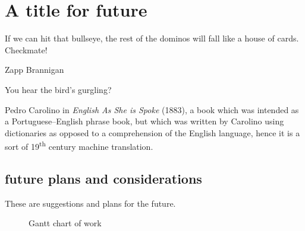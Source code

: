 \chapter{A title for future}
\label{chapter:future}

\epigraph{If we can hit that bullseye, the rest of the dominos will fall like a house of cards. Checkmate!}{Zapp Brannigan}

\epigraph{You hear the bird's gurgling?}{Pedro Carolino in \emph{English As She is Spoke} (1883), a book which was intended as a Portuguese--English phrase book, but which was written by Carolino using dictionaries as opposed to a comprehension of the English language, hence it is a sort of 19\textsuperscript{th} century machine translation.}

\section{future plans and considerations}

These are suggestions and plans for the future.

\begin{figure}
\label{Gantt_chart_1}
\begin{centering}
\caption{Gantt chart of work}
\end{centering}
\end{figure}
